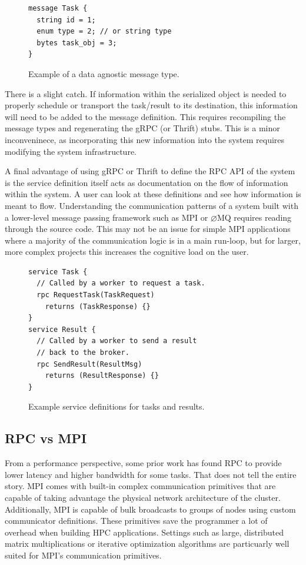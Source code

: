 \documentclass[conference]{IEEEtran}
\begin{document}
\begin{figure}
  \begin{lstlisting}
message Task {
  string id = 1;
  enum type = 2; // or string type
  bytes task_obj = 3;
}
  \end{lstlisting}
  \caption{Example of a data agnostic message type.}\label{fig:data-agnostic}
\end{figure}

There is a slight catch. If information within the serialized object
is needed to properly schedule or transport the task/result to its
destination, this information will need to be added to the message
definition. This requires recompiling the message types and regenerating
the gRPC (or Thrift) stubs. This is a minor inconveninece, as incorporating
this new information into the system requires modifying the system
infrastructure.

A final advantage of using gRPC or Thrift to define the RPC API of the system is
the service definition itself acts as documentation on the flow of information
within the system. A user can look at these definitions and see how information
is meant to flow. Understanding the communication patterns of a system built
with a lower-level message passing framework such as MPI or $\varnothing$MQ requires
reading through the source code. This may not be an issue for simple MPI applications
where a majority of the communication logic is in a main run-loop, but for larger,
more complex projects this increases the cognitive load on the user.

\begin{figure}
  \begin{lstlisting}
service Task {
  // Called by a worker to request a task.
  rpc RequestTask(TaskRequest)
    returns (TaskResponse) {}
}
service Result {
  // Called by a worker to send a result
  // back to the broker.
  rpc SendResult(ResultMsg)
    returns (ResultResponse) {}
}
  \end{lstlisting}
  \caption{Example service definitions for tasks and results.}
  \label{fig:task-result-services}
\end{figure}

\subsection{RPC vs MPI}
From a performance perspective, some prior work \cite{rpc-perf} has found RPC to
provide lower latency and higher bandwidth for some tasks. That does not tell
the entire story. MPI comes with built-in complex communication primitives that
are capable of taking advantage the physical network architecture of the
cluster. Additionally, MPI is capable of bulk broadcasts to groups of nodes
using custom communicator definitions. These primitives save the programmer a
lot of overhead when building HPC applications. Settings such as large,
distributed matrix multiplications or iterative optimization algorithms are
particuarly well suited for MPI's communication primitives.
\end{document}
